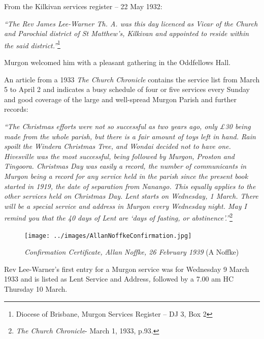 From the Kilkivan services register -- 22 May 1932:



\emph{``The Rev James Lee-Warner Th. A. was this day licenced as Vicar of the Church and Parochial district of St Matthew's, Kilkivan and appointed to reside within the said district.''}\footnote{Diocese of Brisbane, Murgon Services Register -- DJ 3, Box 2}


Murgon welcomed him with a pleasant gathering in the Oddfellows Hall.



An article from a 1933 \emph{The Church Chronicle} contains the service list from March 5 to April 2 and indicates a busy schedule of four or five services every Sunday and good coverage of the large and well-spread Murgon Parish and further records:



\emph{``The Christmas efforts were not so successful as two years ago, only \pounds30 being made from the whole parish, but there is a fair amount of toys left in hand. Rain spoilt the Windera Christmas Tree, and Wondai decided not to have one. Hivesville was the most successful, being followed by Murgon, Proston and Tingoora. Christmas Day was easily a record, the number of communicants in Murgon being a record for any service held in the parish since the present book started in 1919, the date of separation from Nanango. This equally applies to the other services held on Christmas Day. Lent starts on Wednesday, 1 March. There will be a special service and address in Murgon every Wednesday night. May I remind you that the 40 days of Lent are `days of fasting, or abstinence'.''}\footnote{\emph{The Church Chronicle}- March 1, 1933, p.93.}


\medskip








\begin{figure}[!htb]
\begin{center}
\texttt{[image: ../images/AllanNoffkeConfirmation.jpg]}
\caption{{\itshape Confirmation Certificate, Allan Noffke, 26 February 1939} {\scriptsize(A Noffke)}}
\end{center}
\end{figure}




Rev Lee-Warner's first entry for a Murgon service was for Wednesday 9 March 1933 and is listed as Lent Service and Address\emph{,} followed by a 7.00 am HC Thursday 10 March.



